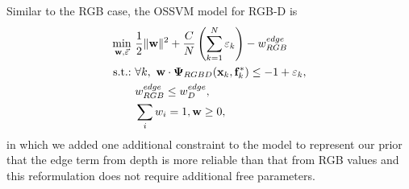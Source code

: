 \documentclass[10pt,journal,compsoc]{newIEEEtran}
\begin{document}
Similar to the RGB case, the OSSVM model for RGB-D is
\begin{equation}\label{EQ:OSSVM_RGBD_p}
\begin{split}
\min_{\mathbf{w},\vec{\varepsilon}}~& {1\over2}\|\mathbf{w}\|^2 + {C\over N}\left(\sum_{k=1}^N \varepsilon_k\right) - w^{edge}_{RGB} \\
\hbox{s.t.:}~&  \forall k,~ \mathbf{w}\cdot\mathbf{\Psi}_{RGBD}(\mathbf{x}_k,\mathbf{f}^*_k)\leq -1+\varepsilon_k, \\
&  w^{edge}_{RGB}\leq w^{edge}_{D}, \\            
&  \sum_i w_i=1, \mathbf{w}\geq 0, \\
\end{split}
\end{equation}
in which we added one additional constraint to the model to represent our prior that the edge term from depth is more reliable than that from RGB values and this reformulation does not require additional free parameters. 
\end{document}

